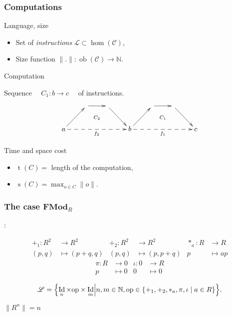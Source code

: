 \documentclass[10pt]{beamer}
\newcommand{\cat}[1]{\mathscr{#1}}
\newcommand{\lcat}[1]{\mathbf{#1}}
\newcommand{\C}{\cat{C}}
\renewcommand{\L}{\cat{L}}
\newcommand{\size}[1]{\lVert#1\rVert}
\DeclareMathOperator{\ob}{ob}
\DeclareMathOperator{\Id}{Id}
\newcommand{\N}{\mathbb{N}}
\newcommand{\ra}{\rightarrow}
\DeclareMathOperator{\Time}{t}
\DeclareMathOperator{\Space}{s}
\begin{document}
\begin{frame}
  \frametitle{Computations}

  \begin{block}{Language, size}
    \begin{itemize}
    \item Set of \emph{instructions} \hfill $\L \subset \hom(\C)$,
    \item Size function \hfill $\size{.} : \ob(\C)\ra\N$.
    \end{itemize}
  \end{block}

  \begin{block}{Computation}
    \begin{center}
      Sequence $\quad C_1:b\ra c\quad$ of instructions.
    \end{center}
  \end{block}

  \[\xymatrix{
    & \ar[r]\ar@{}[dr]|{C_2} & \ar[dr] &
    & \ar[r]\ar@{}[dr]|{C_1} & \ar[dr] \\
    a \ar[ur]\ar@{-->}[rrr]_{f_2} &&& b
    \ar[ur]\ar@{-->}[rrr]_{f_1} &&& c
  }\]

  \begin{block}{Time and space cost}
    \begin{itemize}
    \item $\Time(C) = $ length of the computation,
    \item $\Space(C) = \max_{o\in C}\size{o}$.
    \end{itemize}
  \end{block}

\end{frame}


\begin{frame}
  \frametitle{The case $\lcat{FMod}_R$}
  \cite{BLS03} :

  \begin{align*}
    +_1 : R^2 &\ra R^2         &   +_2 : R^2&\ra R^2       &  *_a : R&\ra R\\
    (p,q)&\mapsto(p+q,q)  &      (p,q)&\mapsto(p,p+q) &       p&\mapsto ap
  \end{align*}
  \begin{align*}
    \pi : R&\ra 0     &  \iota : 0&\ra R   \\
          p&\mapsto0  &          0&\mapsto0
  \end{align*}
  
  \begin{block}{}
    \begin{equation*}
      \label{eq:linlang}
      \L = \Bigl\{\Id_n\times\mathrm{op}\times\Id_m \Bigl\lvert
      n,m\in\N, \mathrm{op}\in\{+_1,+_2,*_a,\pi,\iota\;|\;a\in R\} \Bigr\}
      \text{.}
    \end{equation*}
  \end{block}

  \begin{block}{}
    \begin{center}
      $\size{R^n} = n$
    \end{center}
  \end{block}

\end{frame}
\end{document}
